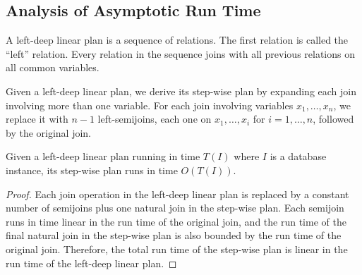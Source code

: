 \subsection{Analysis of Asymptotic Run Time}
\begin{definition}
  A left-deep linear plan is a sequence of relations. 
  The first relation is called the ``left'' relation.
  Every relation in the sequence joins with all previous
    relations on all common variables.
\end{definition}

\begin{definition}
  Given a left-deep linear plan, 
    we derive its step-wise plan by expanding
    each join involving more than one variable.
  For each join involving variables $x_1, \ldots, x_n$,
    we replace it with $n-1$ left-semijoins,
    each one on $x_1, \ldots, x_i$ for $i = 1, \ldots, n$,
    followed by the original join.
\end{definition}

\begin{lemma}
  Given a left-deep linear plan running in time $T(I)$
    where $I$ is a database instance,
    its step-wise plan runs in time $O(T(I))$.
\end{lemma}
\begin{proof}
  Each join operation in the left-deep linear plan is replaced
    by a constant number of semijoins plus one natural join
    in the step-wise plan.
  Each semijoin runs in time linear in the run time of the original join,
    and the run time of the final natural join in the step-wise plan
    is also bounded by the run time of the original join.
  Therefore, the total run time of the step-wise plan is linear
    in the run time of the left-deep linear plan.
\end{proof}

